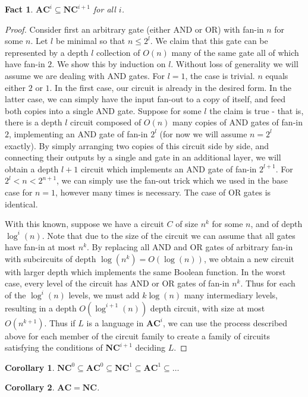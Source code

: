 \documentclass{article}
\theoremstyle{definition}
\theoremstyle{plain}
\theoremstyle{theorem}
\newtheorem{fact}{Fact}[section]
\newtheorem{corollary}{Corollary}[section]
\begin{document}
\begin{fact}
	$\bm{AC}^i \subseteq \bm{NC}^{i+1}$ for all $i$.
\end{fact}
\begin{proof}
	Consider first an arbitrary gate (either AND or OR) with fan-in $n$ for some $n$. Let $l$ be minimal so that $n \leq 2^l$. We claim that this gate can be represented by a depth $l$ collection of $O(n)$ many of the same gate all of which have fan-in $2$. We show this by induction on $l$. Without loss of generality we will assume we are dealing with AND gates. For $l=1$, the case is trivial. $n$ equals either $2$ or $1$. In the first case, our circuit is already in the desired form. In the latter case, we can simply have the input fan-out to a copy of itself, and feed both copies into a single AND gate. Suppose for some $l$ the claim is true - that is, there is a depth $l$ circuit composed of $O(n)$ many copies of AND gates of fan-in $2$, implementing an AND gate of fan-in $2^l$ (for now we will assume $n = 2^l$ exactly). By simply arranging two copies of this circuit side by side, and connecting their outputs by a single and gate in an additional layer, we will obtain a depth $l+1$ circuit which implements an AND gate of fan-in $2^{l+1}$. For $2^l < n < 2^{n+1}$, we can simply use the fan-out trick which we used in the base case for $n=1$, however many times is necessary. The case of OR gates is identical. \par 
	With this known, suppose we have a circuit $C$ of size $n^k$ for some $n$, and of depth $\log^i(n)$. Note that due to the size of the circuit we can assume that all gates have fan-in at most $n^k$. By replacing all AND and OR gates of arbitrary fan-in with subcircuits of depth $\log(n^k) = O(\log(n))$, we obtain a new circuit with larger depth which implements the same Boolean function. In the worst case, every level of the circuit has AND or OR gates of fan-in $n^k$. Thus for each of the $\log^i(n)$ levels, we must add $k\log(n)$ many intermediary levels, resulting in a depth $O(\log^{i+1}(n))$ depth circuit, with size at most $O(n^{k+1})$. Thus if $L$ is a language in $\bm{AC}^i$, we can use the process described above for each member of the circuit family to create a family of circuits satisfying the conditions of $\bm{NC}^{i+1}$ deciding $L$. 
\end{proof}
\begin{corollary}
	$\bm{NC}^0 \subseteq \bm{AC}^0 \subseteq \bm{NC}^1 \subseteq \bm{AC}^1 \subseteq \ldots$
\end{corollary}
\begin{corollary}
	$\bm{AC} = \bm{NC}$.
\end{corollary}
\end{document}
